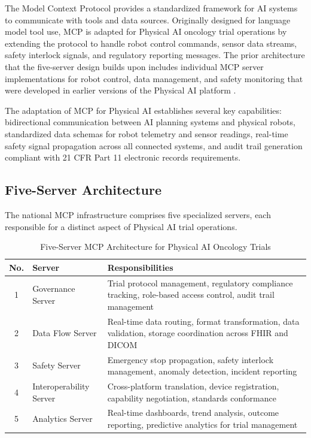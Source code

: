 The Model Context Protocol \cite{mcp-protocol} provides a standardized
framework for AI systems to communicate with tools and data sources. Originally
designed for language model tool use, MCP is adapted for Physical AI oncology
trial operations by extending the protocol to handle robot control commands,
sensor data streams, safety interlock signals, and regulatory reporting
messages. The prior architecture that the five-server design builds upon
includes individual MCP server implementations for robot control, data
management, and safety monitoring that were developed in earlier versions of
the Physical AI platform \cite{main-repo}.

The adaptation of MCP for Physical AI establishes several key capabilities:
bidirectional communication between AI planning systems and physical robots,
standardized data schemas for robot telemetry and sensor readings, real-time
safety signal propagation across all connected systems, and audit trail
generation compliant with 21 CFR Part 11 electronic records requirements.

\subsection{Five-Server Architecture}
\label{subsec:mcp-architecture}

The national MCP infrastructure comprises five specialized servers, each
responsible for a distinct aspect of Physical AI trial operations.

\begin{table}[H]
\centering
\caption{Five-Server MCP Architecture for Physical AI Oncology Trials}
\label{tab:mcp-servers}
\small
\begin{tabularx}{\textwidth}{c l X}
\toprule
\textbf{No.} & \textbf{Server} & \textbf{Responsibilities} \\
\midrule
1 & Governance Server & Trial protocol management, regulatory compliance tracking, role-based access control, audit trail management \\
2 & Data Flow Server & Real-time data routing, format transformation, data validation, storage coordination across FHIR and DICOM \\
3 & Safety Server & Emergency stop propagation, safety interlock management, anomaly detection, incident reporting \\
4 & Interoperability Server & Cross-platform translation, device registration, capability negotiation, standards conformance \\
5 & Analytics Server & Real-time dashboards, trend analysis, outcome reporting, predictive analytics for trial management \\
\bottomrule
\end{tabularx}
\end{table}

